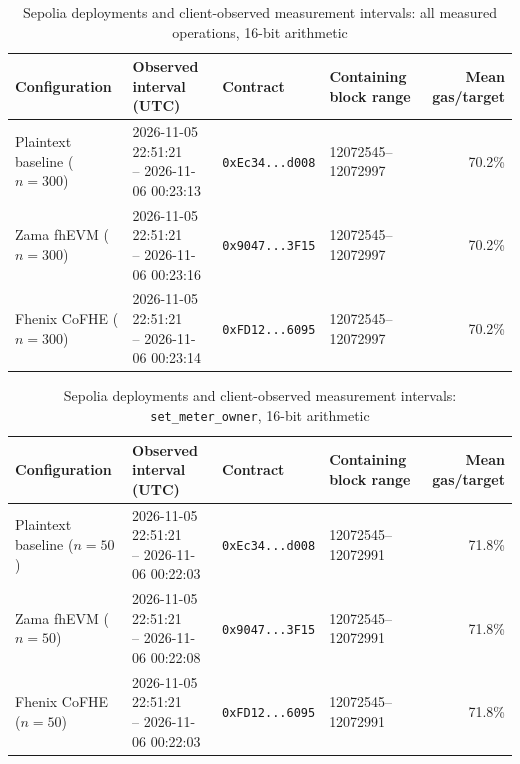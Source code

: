 \begin{table}[!t]
\caption{Sepolia deployments and client-observed measurement intervals: all measured operations, 16-bit arithmetic}
\label{tab:sepolia-client-intervals-classic-euint16-overall}
\centering
\footnotesize
\setlength{\tabcolsep}{4pt}
\begin{tabular}{|l|l|l|l|r|}
\hline
\textbf{Configuration} &
\textbf{Observed interval (UTC)} &
\textbf{Contract} &
\textbf{Containing block range} &
\textbf{Mean gas/target} \\
\hline
Plaintext baseline (\(n=300\)) &
\shortstack[l]{2026-11-05 22:51:21 \\ -- 2026-11-06 00:23:13} &
\texttt{0xEc34...d008} &
12072545--12072997 &
70.2\% \\
\hline
Zama fhEVM (\(n=300\)) &
\shortstack[l]{2026-11-05 22:51:21 \\ -- 2026-11-06 00:23:16} &
\texttt{0x9047...3F15} &
12072545--12072997 &
70.2\% \\
\hline
Fhenix CoFHE (\(n=300\)) &
\shortstack[l]{2026-11-05 22:51:21 \\ -- 2026-11-06 00:23:14} &
\texttt{0xFD12...6095} &
12072545--12072997 &
70.2\% \\
\hline
\end{tabular}
\end{table}

\begin{table}[!t]
\caption{Sepolia deployments and client-observed measurement intervals: \texttt{set\_meter\_owner}, 16-bit arithmetic}
\label{tab:sepolia-client-intervals-classic-euint16-set-meter-owner}
\centering
\footnotesize
\setlength{\tabcolsep}{4pt}
\begin{tabular}{|l|l|l|l|r|}
\hline
\textbf{Configuration} &
\textbf{Observed interval (UTC)} &
\textbf{Contract} &
\textbf{Containing block range} &
\textbf{Mean gas/target} \\
\hline
Plaintext baseline (\(n=50\)) &
\shortstack[l]{2026-11-05 22:51:21 \\ -- 2026-11-06 00:22:03} &
\texttt{0xEc34...d008} &
12072545--12072991 &
71.8\% \\
\hline
Zama fhEVM (\(n=50\)) &
\shortstack[l]{2026-11-05 22:51:21 \\ -- 2026-11-06 00:22:08} &
\texttt{0x9047...3F15} &
12072545--12072991 &
71.8\% \\
\hline
Fhenix CoFHE (\(n=50\)) &
\shortstack[l]{2026-11-05 22:51:21 \\ -- 2026-11-06 00:22:03} &
\texttt{0xFD12...6095} &
12072545--12072991 &
71.8\% \\
\hline
\end{tabular}
\end{table}


